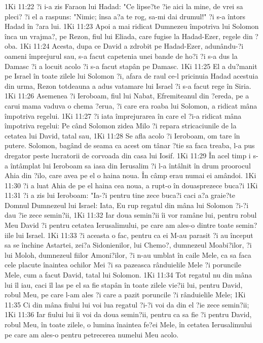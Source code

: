 1Ki 11:22  ?i i-a zis Faraon lui Hadad: "Ce lipse?te ?ie aici la mine, de vrei sa pleci? ?i el a raspuns: "Nimic; însa a?a te rog, sa-mi dai drumul!" ?i s-a întors Hadad în ?ara lui.
1Ki 11:23  Apoi a mai ridicat Dumnezeu împotriva lui Solomon înca un vrajma?, pe Rezon, fiul lui Eliada, care fugise la Hadad-Ezer, regele din ?oba.
1Ki 11:24  Acesta, dupa ce David a zdrobit pe Hadad-Ezer, adunându-?i oameni împrejurul sau, s-a facut capetenia unei bande de ho?i ?i s-a dus la Damasc ?i a locuit acolo ?i s-a facut stapân pe Damasc.
1Ki 11:25  El a du?manit pe Israel în toate zilele lui Solomon ?i, afara de raul ce-l pricinuia Hadad acestuia din urma, Rezon totdeauna a adus vatamare lui Israel ?i s-a facut rege în Siria.
1Ki 11:26  Asemenea ?i Ieroboam, fiul lui Nabat, Efremiteanul din ?ereda, pe a carui mama vaduva o chema ?erua, ?i care era roaba lui Solomon, a ridicat mâna împotriva regelui.
1Ki 11:27  ?i iata împrejurarea în care el ?i-a ridicat mâna împotriva regelui: Pe când Solomon zidea Milo ?i repara stricaciunile de la cetatea lui David, tatal sau,
1Ki 11:28  Se afla acolo ?i Ieroboam, om tare în putere. Solomon, bagând de seama ca acest om tânar ?tie sa faca treaba, l-a pus dregator peste lucratorii de corvoada din casa lui Iosif.
1Ki 11:29  În acel timp i s-a întâmplat lui Ieroboam sa iasa din Ierusalim ?i l-a întâlnit în drum proorocul Ahia din ?ilo, care avea pe el o haina noua. În câmp erau numai ei amândoi.
1Ki 11:30  ?i a luat Ahia de pe el haina cea noua, a rupt-o în douasprezece buca?i
1Ki 11:31  ?i a zis lui Ieroboam: "Ia-?i pentru tine zece buca?i caci a?a graie?te Domnul Dumnezeul lui Israel: Iata, Eu rup regatul din mâna lui Solomon ?i-?i dau ?ie zece semin?ii,
1Ki 11:32  Iar doua semin?ii îi vor ramâne lui, pentru robul Meu David ?i pentru cetatea Ierusalimului, pe care am ales-o dintre toate semin?iile lui Israel.
1Ki 11:33  ?i aceasta o fac, pentru ca ei M-au parasit ?i au început sa se închine Astartei, zei?a Sidonienilor, lui Chemo?, dumnezeul Moabi?ilor, ?i lui Moloh, dumnezeul fiilor Amoni?ilor, ?i n-au umblat în caile Mele, ca sa faca cele placute înaintea ochilor Mei ?i sa pazeasca rânduielile Mele ?i poruncile Mele, cum a facut David, tatal lui Solomon.
1Ki 11:34  Tot regatul nu din mâna lui îl iau, caci îl las pe el sa fie stapân în toate zilele vie?ii lui, pentru David, robul Meu, pe care l-am ales ?i care a pazit poruncile ?i rânduielile Mele;
1Ki 11:35  Ci din mâna fiului lui voi lua regatul ?i-?i voi da din el ?ie zece semin?ii;
1Ki 11:36  Iar fiului lui îi voi da doua semin?ii, pentru ca sa fie ?i pentru David, robul Meu, în toate zilele, o lumina înaintea fe?ei Mele, în cetatea Ierusalimului pe care am ales-o pentru petrecerea numelui Meu acolo.
